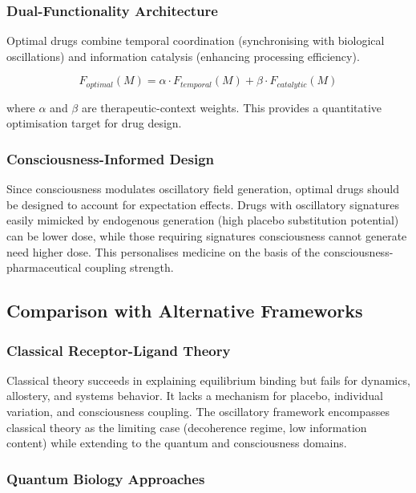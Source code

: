 \documentclass{article}
\theoremstyle{definition}
\theoremstyle{remark}
\begin{document}
\subsubsection{Dual-Functionality Architecture}

Optimal drugs combine temporal coordination (synchronising with biological oscillations) and information catalysis (enhancing processing efficiency).

\begin{equation}
F_{optimal}(M) = \alpha \cdot F_{temporal}(M) + \beta \cdot F_{catalytic}(M)
\label{eq:dual_function}
\end{equation}

where $\alpha$ and $\beta$ are therapeutic-context weights. This provides a quantitative optimisation target for drug design.

\subsubsection{Consciousness-Informed Design}

Since consciousness modulates oscillatory field generation, optimal drugs should be designed to account for expectation effects. Drugs with oscillatory signatures easily mimicked by endogenous generation (high placebo substitution potential) can be lower dose, while those requiring signatures consciousness cannot generate need higher dose. This personalises medicine on the basis of the consciousness-pharmaceutical coupling strength.

\subsection{Comparison with Alternative Frameworks}

\subsubsection{Classical Receptor-Ligand Theory}

Classical theory succeeds in explaining equilibrium binding but fails for dynamics, allostery, and systems behavior. It lacks a mechanism for placebo, individual variation, and consciousness coupling. The oscillatory framework encompasses classical theory as the limiting case (decoherence regime, low information content) while extending to the quantum and consciousness domains.


    
\subsubsection{Quantum Biology Approaches}
\end{document}
